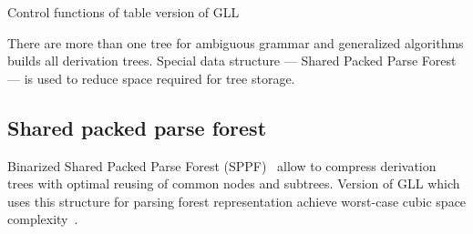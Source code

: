 \begin{algorithm}[h]
\begin{algorithmic}[1]
\caption{Control functions of table version of GLL}
\label{mainTblFunctions}
  \Else
  \EndIf
\EndFunction

       \Else 
       \EndIf
       \EndIf
  \EndCase
       \EndFor
  \EndCase
  \EndCase
  \EndCase
  \EndSwitch
\EndFunction

      \Else
      \EndIf
  \EndWhile
\EndFunction

\end{algorithmic}
\end{algorithm}

There are more than one tree for ambiguous grammar and generalized algorithms builds all derivation trees. Special data structure --- Shared Packed Parse Forest~\cite{SPPF} --- is used to reduce space required for tree storage.


\subsection{Shared packed parse forest}

Binarized Shared Packed Parse Forest (SPPF)~\cite{brnglr} allow to compress derivation trees with optimal reusing of common nodes and subtrees.
Version of GLL which uses this structure for parsing forest representation achieve worst-case cubic space complexity~\cite{gllParsingTree}.

